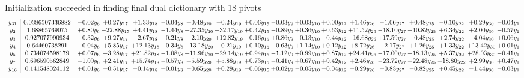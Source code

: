 \documentclass[9pt]{article}
\begin{document}
Initialization succeeded in finding final dual dictionary with 18 pivots
\[\begin{array}{c| c c@{\hskip 2pt} c@{\hskip 2pt} c@{\hskip 2pt} c@{\hskip 2pt} c@{\hskip 2pt} c@{\hskip 2pt} c@{\hskip 2pt} c@{\hskip 2pt} c@{\hskip 2pt} c@{\hskip 2pt} c@{\hskip 2pt} c@{\hskip 2pt} c@{\hskip 2pt} c@{\hskip 2pt} c@{\hskip 2pt} c@{\hskip 2pt} }
 y_{31}   &  0.0386507336882 & -0.02 y_{6} & +  0.27 y_{17} & +  1.33 y_{18} & -0.04 y_{8} & +  0.48 y_{20} & -0.24 y_{19} & +  0.06 y_{15} & -0.03 y_{9} & +  0.03 y_{10} & +  0.00 y_{12} & +  1.46 y_{26} & -1.06 y_{27} & +  0.48 y_{25} & -0.10 y_{22} & +  0.29 y_{30} & -0.04 y_{1}\\
 y_{2}   &  1.68865769075 & +  0.80 y_{6} & -22.88 y_{17} & +  4.41 y_{18} & -1.44 y_{8} & + 27.35 y_{20} & -32.17 y_{19} & +  0.42 y_{15} & -0.89 y_{9} & +  0.36 y_{10} & +  0.63 y_{12} & + 11.52 y_{26} & -18.10 y_{27} & + 10.82 y_{25} & +  6.34 y_{22} & +  2.00 y_{30} & -0.57 y_{1}\\
 y_{3}   &  0.927077990934 & -0.32 y_{6} & +  9.27 y_{17} & -2.67 y_{18} & +  0.21 y_{8} & -2.10 y_{20} & + 12.82 y_{19} & -0.16 y_{15} & +  0.86 y_{9} & -0.13 y_{10} & -0.44 y_{12} & -16.68 y_{26} & + 17.59 y_{27} & -0.48 y_{25} & +  2.74 y_{22} & -4.04 y_{30} & +  0.06 y_{1}\\
 y_{4}   &  0.64460738291 & -0.04 y_{6} & +  5.85 y_{17} & + 12.13 y_{18} & -0.34 y_{8} & + 13.18 y_{20} & -0.21 y_{19} & +  0.10 y_{15} & -0.63 y_{9} & +  1.14 y_{10} & +  0.12 y_{12} & +  8.72 y_{26} & -2.17 y_{27} & +  1.26 y_{25} & +  1.33 y_{22} & + 13.42 y_{30} & +  0.01 y_{1}\\
 y_{5}   &  0.734074598179 & +  0.07 y_{6} & -3.28 y_{17} & + 21.82 y_{18} & -1.08 y_{8} & + 11.96 y_{20} & -29.14 y_{19} & +  0.94 y_{15} & -1.12 y_{9} & +  0.99 y_{10} & +  0.87 y_{12} & + 24.41 y_{26} & -17.00 y_{27} & + 18.13 y_{25} & +  5.37 y_{22} & + 28.03 y_{30} & -0.41 y_{1}\\
 y_{7}   &  0.696590562849 & -1.00 y_{6} & +  2.41 y_{17} & + 15.74 y_{18} & -0.57 y_{8} & +  5.59 y_{20} & +  5.88 y_{19} & +  0.73 y_{15} & -0.41 y_{9} & +  0.67 y_{10} & +  0.42 y_{12} & +  2.46 y_{26} & -23.72 y_{27} & + 22.48 y_{25} & -18.80 y_{22} & +  2.99 y_{30} & +  0.47 y_{1}\\
 y_{16}   &  0.141548024112 & +  0.01 y_{6} & -0.51 y_{17} & -0.14 y_{18} & +  0.01 y_{8} & -0.65 y_{20} & +  0.29 y_{19} & -0.06 y_{15} & +  0.02 y_{9} & -0.05 y_{10} & -0.04 y_{12} & -0.29 y_{26} & +  0.83 y_{27} & -0.82 y_{25} & +  0.45 y_{22} & -1.44 y_{30} & -0.03 y_{1}\\

\end{array}\]
\end{document}
